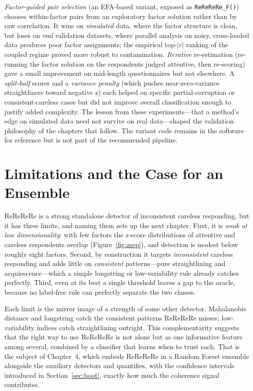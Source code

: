\emph{Factor-guided pair selection} (an EFA-based variant, exposed as
\texttt{ReReReRe\_F()}) chooses within-factor pairs from an exploratory factor
solution rather than by raw correlation. It wins on \emph{simulated} data, where
the factor structure is clean, but loses on \emph{real} validation datasets,
where parallel analysis on noisy, cross-loaded data produces poor factor
assignments; the empirical top-$|r|$ ranking of the coupled regime proved more
robust to contamination. \emph{Iterative} re-estimation (re-running the factor
solution on the respondents judged attentive, then re-scoring) gave a small
improvement on mid-length questionnaires but not elsewhere. A \emph{split-half}
scorer and a \emph{variance penalty} (which pushes near-zero-variance
straightliners toward negative z) each helped on specific partial-corruption or
consistent-careless cases but did not improve overall classification enough to
justify added complexity. The lesson from these experiments---that a method's
edge on simulated data need not survive on real data---shaped the validation
philosophy of the chapters that follow. The variant code remains in the software
for reference but is not part of the recommended pipeline.

\section{Limitations and the Case for an Ensemble}

ReReReRe is a strong standalone detector of inconsistent careless responding,
but it has three limits, and naming them sets up the next chapter. First, it is
\emph{weak at low dimensionality}: with few factors the z-score distributions of
attentive and careless respondents overlap (Figure~\ref{fig:zsep}), and
detection is modest below roughly eight factors. Second, by construction it
targets \emph{inconsistent} careless responding and adds little on
\emph{consistent} patterns---pure straightlining and acquiescence---which a
simple longstring or low-variability rule already catches perfectly. Third, even
at its best a single threshold leaves a gap to the oracle, because no
label-free rule can perfectly separate the two classes.

Each limit is the mirror image of a strength of some other detector. Mahalanobis
distance and longstring catch the consistent patterns ReReReRe misses;
low-variability indices catch straightlining outright. This complementarity
suggests that the right way to use ReReReRe is not alone but as one informative
feature among several, combined by a classifier that learns when to trust each.
That is the subject of Chapter~4, which embeds ReReReRe in a Random Forest
ensemble alongside the auxiliary detectors and quantifies, with the confidence
intervals introduced in Section~\ref{sec:boot}, exactly how much the coherence signal
contributes.

